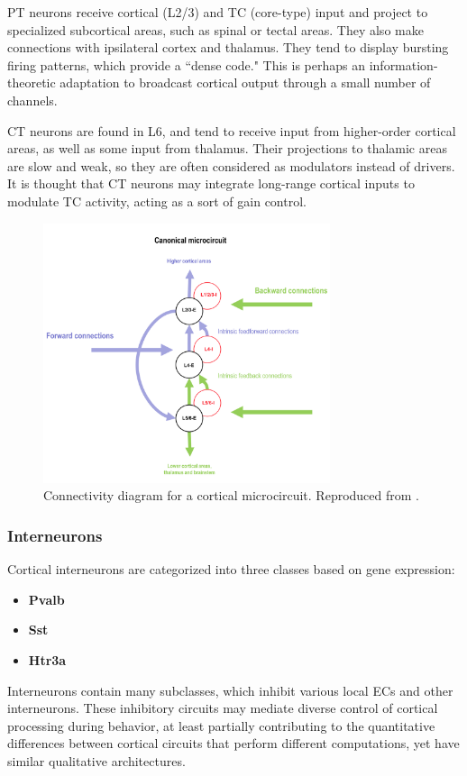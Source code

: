 PT neurons receive cortical (L2/3) and TC (core-type) input and project to specialized subcortical areas, such as spinal or tectal areas. They also make connections with ipsilateral cortex and thalamus. They tend to display bursting firing patterns, which provide a ``dense code." This is perhaps an information-theoretic adaptation to broadcast cortical output through a small number of channels. 

CT neurons are found in L6, and tend to receive input from higher-order cortical areas, as well as some input from thalamus. Their projections to thalamic areas are slow and weak, so they are often considered as modulators instead of drivers. It is thought that CT neurons may integrate long-range cortical inputs to modulate TC activity, acting as a sort of gain control. 

\begin{figure}[h]
    \centering
    \includegraphics[width=0.75\textwidth]{images/neuroscience/pc_connectivity.png}
    \caption{Connectivity diagram for a cortical microcircuit. Reproduced from \cite{bastos2012canonical}.}
    \label{fig: pc connectivity}
\end{figure}

\subsubsection{Interneurons}

Cortical interneurons are categorized into three classes based on gene expression:
\begin{itemize}
	\item \textbf{Pvalb}
	\item \textbf{Sst}
	\item \textbf{Htr3a}
\end{itemize}
Interneurons contain many subclasses, which inhibit various local ECs and other interneurons. These inhibitory circuits may mediate diverse control of cortical processing during behavior, at least partially contributing to the quantitative differences between cortical circuits that perform different computations, yet have similar qualitative architectures. 

